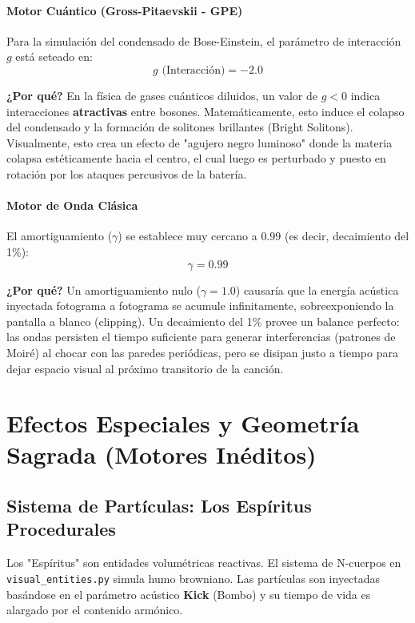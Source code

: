 \documentclass[12pt]{book}
\begin{document}
\subsection{Motor Cuántico (Gross-Pitaevskii - GPE)}
Para la simulación del condensado de Bose-Einstein, el parámetro de interacción $g$ está seteado en:
\begin{equation}
g \text{ (Interacción)} = -2.0
\end{equation}

\textbf{¿Por qué?} En la física de gases cuánticos diluidos, un valor de $g < 0$ indica interacciones \textbf{atractivas} entre bosones. Matemáticamente, esto induce el colapso del condensado y la formación de solitones brillantes (Bright Solitons). Visualmente, esto crea un efecto de "agujero negro luminoso" donde la materia colapsa estéticamente hacia el centro, el cual luego es perturbado y puesto en rotación por los ataques percusivos de la batería.

\subsection{Motor de Onda Clásica}
El amortiguamiento ($\gamma$) se establece muy cercano a $0.99$ (es decir, decaimiento del 1\%):
\begin{equation}
\gamma = 0.99
\end{equation}

\textbf{¿Por qué?} Un amortiguamiento nulo ($\gamma = 1.0$) causaría que la energía acústica inyectada fotograma a fotograma se acumule infinitamente, sobreexponiendo la pantalla a blanco (clipping). Un decaimiento del 1\% provee un balance perfecto: las ondas persisten el tiempo suficiente para generar interferencias (patrones de Moiré) al chocar con las paredes periódicas, pero se disipan justo a tiempo para dejar espacio visual al próximo transitorio de la canción.

\part{Efectos Especiales y Geometría Sagrada (Motores Inéditos)}


\chapter{Sistema de Partículas: Los Espíritus Procedurales}
Los "Espíritus" son entidades volumétricas reactivas. El sistema de N-cuerpos en \texttt{visual\_entities.py} simula humo browniano.
Las partículas son inyectadas basándose en el parámetro acústico \textbf{Kick} (Bombo) y su tiempo de vida es alargado por el contenido armónico.
\end{document}
